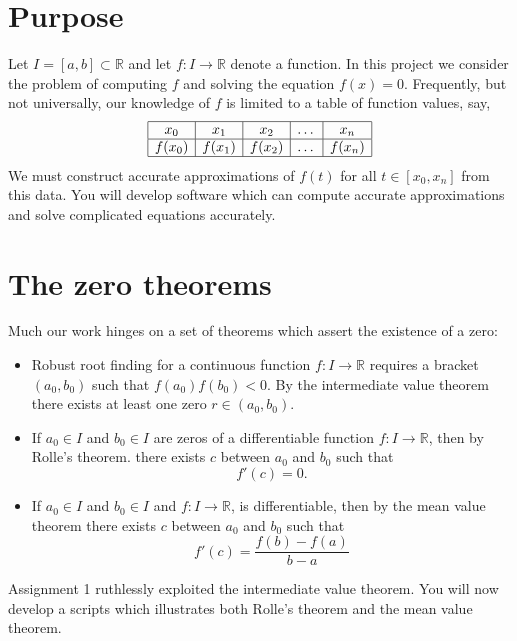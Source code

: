 \documentclass[a4paper,12pt]{article}
\newcounter{problem}
\newcommand{\R}{\mathbb{R}}
\newcommand{\bes}{\begin{equation*}}
\newcommand{\ees}{\end{equation*}}
\newcommand{\be}{\begin{equation}}
\newcommand{\ee}{\end{equation}}
\begin{document}
\newpage

\maketitle

\tableofcontents
\listoffigures

\section{Purpose} Let $I = [a,b] \subset \R$ and let $f: I \rightarrow \R$ denote a function. In this project we consider the problem of computing $f$ and solving the equation $f(x) = 0$. Frequently, but not universally, our knowledge of $f$ is limited to a table of function values, say, 
\bes
\begin{array}{|c|c|c|c|c|} \hline
  x_0 & x_1 & x_2 & \dots & x_n \\ \hline
  f(x_0) & f(x_1) & f(x_2) & \dots & f(x_n) \\ \hline
\end{array}
\ees
We must construct accurate approximations of $f(t)$ for all $t \in [x_0,x_n]$ from this data. You will develop software which can compute accurate approximations and solve complicated equations accurately.
  
\section{The zero theorems} Much our work hinges on a set of theorems which assert the existence of a zero:
  \begin{itemize}
  \item Robust root finding for a continuous function $f : I \rightarrow \R$ requires a bracket $(a_0,b_0)$ such that $f(a_0)f(b_0) < 0$. By the intermediate value theorem there exists at least one zero $r \in (a_0,b_0)$.
  \item If $a_0 \in I$ and $b_0 \in I$ are zeros of a differentiable function $f : I \rightarrow \R$, then by Rolle's theorem. there exists $c$ between $a_0$ and $b_0$ such that
    \bes f'(c)=0.
    \ees
  \item  If $a_0 \in I$ and $b_0 \in I$ and $f : I \rightarrow \R$, is differentiable, then by the mean value theorem there exists $c$ between $a_0$ and $b_0$ such that
    \be
    f'(c)=\frac{f(b)-f(a)}{b-a}
    \ee
  \end{itemize}

  Assignment 1 ruthlessly exploited the intermediate value theorem. You will now develop a scripts which illustrates both Rolle's theorem and the mean value theorem.
\end{document}
